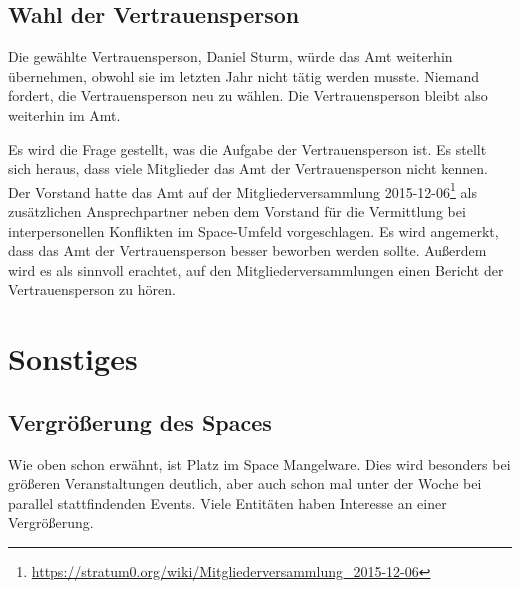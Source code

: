 \documentclass{s0minutes}
\begin{document}
\subsection{Wahl der Vertrauensperson}

Die gewählte Vertrauensperson, Daniel Sturm, würde das Amt weiterhin
übernehmen, obwohl sie im letzten Jahr nicht tätig werden musste. Niemand
fordert, die Vertrauensperson neu zu wählen. Die Vertrauensperson bleibt also
weiterhin im Amt.

Es wird die Frage gestellt, was die Aufgabe der Vertrauensperson ist. Es stellt
sich heraus, dass viele Mitglieder das Amt der Vertrauensperson nicht kennen.
Der Vorstand hatte das Amt auf der Mitgliederversammlung
2015-12-06\footnote{\url{https://stratum0.org/wiki/Mitgliederversammlung_2015-12-06}}
als zusätzlichen Ansprechpartner neben dem Vorstand für die Vermittlung bei
interpersonellen Konflikten im Space-Umfeld vorgeschlagen. Es wird angemerkt,
dass das Amt der Vertrauensperson besser beworben werden sollte. Außerdem wird
es als sinnvoll erachtet, auf den Mitgliederversammlungen einen Bericht der
Vertrauensperson zu hören.

\section{Sonstiges}

\subsection{Vergrößerung des Spaces}

Wie oben schon erwähnt, ist Platz im Space Mangelware. Dies wird besonders bei
größeren Veranstaltungen deutlich, aber auch schon mal unter der Woche bei
parallel stattfindenden Events. Viele Entitäten haben Interesse an einer
Vergrößerung.
\end{document}
